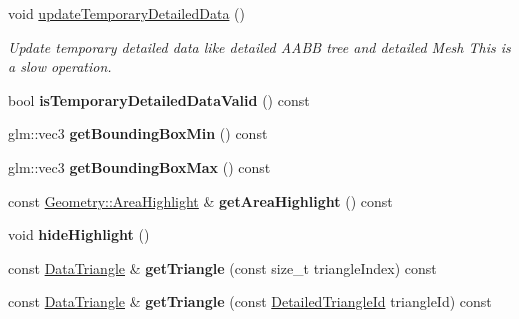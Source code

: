 \begin{DoxyCompactItemize}
\mbox{\label{classpepr3d_1_1_geometry_ad25fda5afe4c73c0fd9dbd4bf77952b1}} 
void \mbox{\hyperlink{classpepr3d_1_1_geometry_ad25fda5afe4c73c0fd9dbd4bf77952b1}{update\+Temporary\+Detailed\+Data}} ()
\begin{DoxyCompactList}\small\item\em Update temporary detailed data like detailed A\+A\+BB tree and detailed Mesh This is a slow operation. \end{DoxyCompactList}\item 
\mbox{\label{classpepr3d_1_1_geometry_a995a46878723dd2108960ad3163097b5}} 
bool {\bfseries is\+Temporary\+Detailed\+Data\+Valid} () const
\item 
\mbox{\label{classpepr3d_1_1_geometry_a672f356239790e119faf9fedac88826c}} 
glm\+::vec3 {\bfseries get\+Bounding\+Box\+Min} () const
\item 
\mbox{\label{classpepr3d_1_1_geometry_a99b2474e709c4965c4936c69c094b02b}} 
glm\+::vec3 {\bfseries get\+Bounding\+Box\+Max} () const
\item 
\mbox{\label{classpepr3d_1_1_geometry_ad37135e84945f5e02ee7135a7fa57429}} 
const \mbox{\hyperlink{structpepr3d_1_1_geometry_1_1_area_highlight}{Geometry\+::\+Area\+Highlight}} \& {\bfseries get\+Area\+Highlight} () const
\item 
\mbox{\label{classpepr3d_1_1_geometry_a671769c7156f27e4666d4db982e30ec6}} 
void {\bfseries hide\+Highlight} ()
\item 
\mbox{\label{classpepr3d_1_1_geometry_a7246a4afe6b3e0624e3b22f7b28aea9e}} 
const \mbox{\hyperlink{classpepr3d_1_1_data_triangle}{Data\+Triangle}} \& {\bfseries get\+Triangle} (const size\+\_\+t triangle\+Index) const
\item 
\mbox{\label{classpepr3d_1_1_geometry_a93214e41fbec98dd0e144af5643611e8}} 
const \mbox{\hyperlink{classpepr3d_1_1_data_triangle}{Data\+Triangle}} \& {\bfseries get\+Triangle} (const \mbox{\hyperlink{structpepr3d_1_1_detailed_triangle_id}{Detailed\+Triangle\+Id}} triangle\+Id) const

\end{DoxyCompactItemize}
